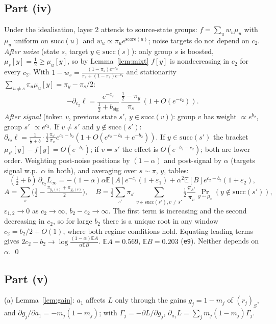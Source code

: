 \documentclass[11pt]{article}
\theoremstyle{definition}\newtheorem{assumption}{Assumption}\newtheorem{definition}{Definition}
\theoremstyle{remark}\newtheorem{remark}{Remark}
\newcommand{\1}{\mathbf{1}}\newcommand{\E}{\mathbb E}
\begin{document}
\subsection{Part (iv)}
Under the idealisation, layer 2 attends to source-state groups: $f=\sum_uw_u\mu_u$ with $\mu_u$ uniform on
$\mathrm{succ}(u)$ and $w_u\propto\pi_ue^{\mathrm{score}(u)}$; noise targets do not depend on $c_2$.
\emph{After noise} (state $s$, target $y\in\mathrm{succ}(s)$): only group $s$ is boosted, $\mu_s[y]=\tfrac12\ge\mu_u[y]$,
so by Lemma~\ref{lem:mixt} $f[y]$ is nondecreasing in $c_2$ for every $c_2$. With
$1-w_s=\frac{(1-\pi_s)e^{-c_2}}{\pi_s+(1-\pi_s)e^{-c_2}}$ and stationarity $\sum_{u\ne s}\pi_u\mu_u[y]=\pi_y-\pi_s/2$:
\[
-\partial_{c_2}\ell=\frac{e^{-c_2}}{\tfrac12+b_{\mathrm{sig}}}\,\frac{\tfrac12-\pi_y}{\pi_s}\,(1+O(e^{-c_2})).
\]
\emph{After signal} (token $v$, previous state $s'$, $y\in\mathrm{succ}(v)$): group $v$ has weight $\propto e^{b_2}$,
group $s'$ $\propto e^{c_2}$. If $v\ne s'$ and $y\notin\mathrm{succ}(s')$: $\partial_{c_2}\ell=\frac{1}{\tfrac12+b}\cdot\frac12\frac{\pi_{s'}}{\pi_v}e^{c_2-b_2}(1+O(e^{c_2-b_2}+e^{-b_2}))$.
If $y\in\mathrm{succ}(s')$ the bracket $\mu_{s'}[y]-f[y]=O(e^{-b_2})$; if $v=s'$ the effect is $O(e^{-b_2-c_2})$; both are
lower order. Weighting post-noise positions by $(1-\alpha)$ and post-signal by $\alpha$ (targets signal w.p.\ $\alpha$
in both), and averaging over $s\sim\pi$, $y$, tables:
\[
(\tfrac12+b)\,\partial_{c_2}L_\infty=-(1-\alpha)\alpha\E[A]e^{-c_2}(1+\varepsilon_1)+\alpha^2\E[B]e^{c_2-b_2}(1+\varepsilon_2),
\]
\[
A=\sum_{s}\Big(\tfrac12-\tfrac{\pi_{y_1(s)}+\pi_{y_2(s)}}2\Big),\quad
B=\tfrac12\sum_{s'}\pi_{s'}\sum_{v\in\mathrm{succ}(s'),v\ne s'}\tfrac12\frac{\pi_{s'}}{\pi_v}\Pr_{y\sim\mu_v}(y\notin\mathrm{succ}(s')),
\]
$\varepsilon_{1,2}\to0$ as $c_2\to\infty$, $b_2-c_2\to\infty$. The first term is increasing and the second
decreasing in $c_2$, so for large $b_2$ there is a unique root in any window $c_2=b_2/2+O(1)$, where both
regime conditions hold. Equating leading terms gives $2c_2-b_2\to\log\frac{(1-\alpha)\E A}{\alpha\E B}$.
$\E A=0.569$, $\E B=0.203$ (\texttt{e9}). Neither depends on $\alpha$. \qed

\subsection{Part (v)}
(a) Lemma~\ref{lem:gain}: $a_1$ affects $L$ only through the gains $g_j=1-m_j$ of $(r_j)_S$, and
$\partial g_j/\partial a_1=-m_j(1-m_j)$; with $\Gamma_j=-\partial L/\partial g_j$,
$\partial_{a_1}L=\sum_jm_j(1-m_j)\Gamma_j$.
\end{document}
